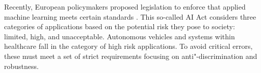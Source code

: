 Recently, European policymakers proposed legislation to enforce that applied machine learning meets certain standards \parencite{europeancommission_briefing_2021}. 
This so-called AI Act considers three categories of applications based on the potential risk they pose to society: limited, high, and unacceptable. 
Autonomous vehicles and systems within healthcare fall in the category of high risk applications. To avoid critical errors, these must meet a set of strict requirements focusing on anti"-discrimination and robustness.


